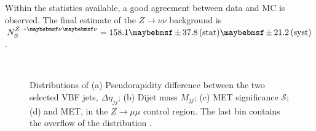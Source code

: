 Within the statistics available, a good agreement between data and MC is observed. The final estimate of the $Z\rightarrow \nu\nu$ background is $N_{S}^{Z\rightarrow\nu\nu}= 158.1 \pm 37.8 \stat \pm 21.2 \syst$.
% 
\begin{figure}[!htb]
\centering
{}
 \\
\caption{Distributions of (a) Pseudorapidity difference between the two selected \gls{VBF} jets, $\Delta\eta_{jj}$; (b) Dijet mass $M_{jj}$; (c) \gls{MET} significance $\mathcal{S}$; (d) and \gls{MET}, in the $Z\rightarrow \mu\mu$ control region. The last bin contains the overflow of the distribution \cite{ARTICLE:CMSVBFHiggsInvisibleParkedAnalysisPAS}.}
\label{FIGURE:ParkedDataAnalysis_ZBackground_KeyDistributions}
\end{figure}

